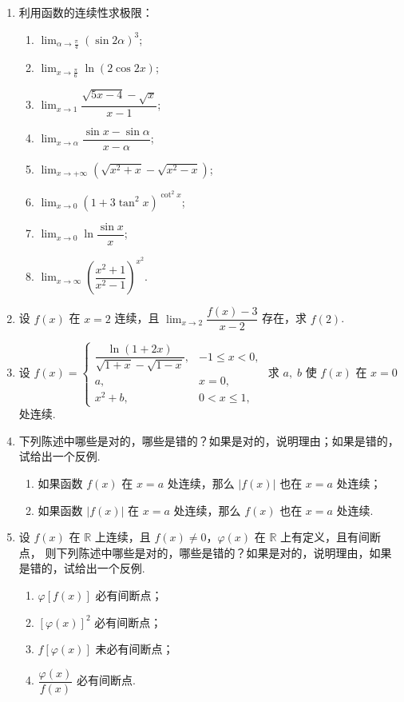 \begin{enumerate}
    \item 利用函数的连续性求极限：
    \begin{enumerate}[(1)]\setlength{\itemsep}{5pt}\setlength{\topsep}{15pt}
        \item $\displaystyle\lim_{\alpha\to\frac{\pi}{4}}(\sin 2\alpha)^3$;
        \item $\displaystyle\lim_{x\to\frac{\pi}{6}}\ln(2\cos 2x)$;
        \item $\displaystyle\lim_{x\to1}\dfrac{\sqrt{5x-4}-\sqrt{x}}{x-1}$;
        \item $\displaystyle\lim_{x\to\alpha}\dfrac{\sin x-\sin \alpha}{x-\alpha}$;
        \item $\displaystyle\lim_{x\to+\infty}(\sqrt{x^2+x}-\sqrt{x^2-x})$;
        \item $\displaystyle\lim_{x\to0}(1+3\tan^2x)^{\cot^2x}$;
        \item $\displaystyle\lim_{x\to0}\ln\dfrac{\sin x}{x}$;
        \item $\displaystyle\lim_{x\to\infty}\left(\dfrac{x^2+1}{x^2-1}\right)^{x^2}$.
    \end{enumerate}

    \item 设 $f(x)$ 在 $x=2$ 连续，且 $\displaystyle\lim_{x\to2}\dfrac{f(x)-3}{x-2}$ 存在，求 $f(2)$.
    
    \item 设 $f(x)=\begin{cases}
        \dfrac{\ln(1+2x)}{\sqrt{1+x}-\sqrt{1-x}},&-1\leqslant x<0,\\
        a,&x=0,\\
        x^2+b,&0<x\leqslant1,
    \end{cases}$ 
    求 $a,\;b$ 使 $f(x)$ 在 $x=0$ 处连续.

    \item 下列陈述中哪些是对的，哪些是错的？如果是对的，说明理由；如果是错的，试给出一个反例.
    \begin{enumerate}[(1)]\setlength{\itemsep}{5pt}\setlength{\topsep}{15pt}
        \item 如果函数 $f(x)$ 在 $x=a$ 处连续，那么 $|f(x)|$ 也在 $x=a$ 处连续；
        \item 如果函数 $|f(x)|$ 在 $x=a$ 处连续，那么 $f(x)$ 也在 $x=a$ 处连续.
    \end{enumerate}

    \item 设 $f(x)$ 在 $\mathbb{R}$ 上连续，且 $f(x)\not=0$，$\varphi(x)$ 在 $\mathbb{R}$ 上有定义，且有间断点，
    则下列陈述中哪些是对的，哪些是错的？如果是对的，说明理由，如果是错的，试给出一个反例.
    \begin{enumerate}[(1)]\setlength{\itemsep}{5pt}\setlength{\topsep}{15pt}
        \item $\varphi[f(x)]$ 必有间断点；
        \item $[\varphi(x)]^2$ 必有间断点；
        \item $f[\varphi(x)]$ 未必有间断点；
        \item $\dfrac{\varphi(x)}{f(x)}$ 必有间断点.
    \end{enumerate}


\end{enumerate}
